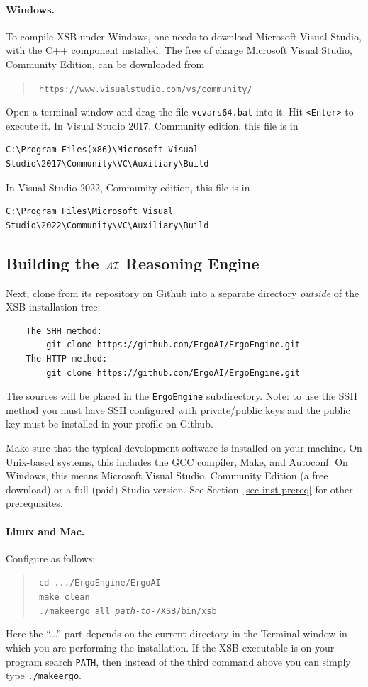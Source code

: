 \documentclass[11pt]{article}
\newcommand{\ERGO}{\mbox{\smaller{\ensuremath{\cal{E}}\smaller{{\sc{RGO}}}}}\xspace}
\newcommand{\ERGOAI}{\mbox{\smaller{\ensuremath{\cal{E}}\smaller{{\sc{RGO}}}}\ensuremath{\cal{AI}}}\xspace}
\newcommand{\FLSYSTEM}{\ERGO}
\begin{document}
\paragraph{Windows.}
To compile XSB under Windows, one needs to download Microsoft Visual Studio,
with the C++ component installed.
The free of charge Microsoft Visual Studio, Community Edition, can be
downloaded from
\begin{quote}
\tt
 https://www.visualstudio.com/vs/community/
\end{quote}

Open a terminal window and drag the file \texttt{vcvars64.bat} into it.
Hit \texttt{<Enter>} to execute it. 
In Visual Studio 2017, Community edition, this file is in
\begin{verbatim}
C:\Program Files(x86)\Microsoft Visual Studio\2017\Community\VC\Auxiliary\Build
\end{verbatim}
In Visual Studio 2022, Community edition, this file is in
\begin{verbatim}
C:\Program Files\Microsoft Visual Studio\2022\Community\VC\Auxiliary\Build
\end{verbatim}


\subsection{Building the \ERGOAI Reasoning Engine}

\sloppy
Next, clone \FLSYSTEM from its repository on Github
into a
separate directory \emph{outside} of the XSB installation tree:
\begin{verbatim}
    The SHH method:
        git clone https://github.com/ErgoAI/ErgoEngine.git
    The HTTP method:
        git clone https://github.com/ErgoAI/ErgoEngine.git
\end{verbatim}
The \FLSYSTEM
sources will be placed in the {\tt ErgoEngine} subdirectory.
Note: to use the SSH method you  must have SSH configured with
private/public keys and the public key must be installed in your profile on
Github.

Make sure that the typical development software is installed on your
machine. On Unix-based systems, this includes the GCC compiler, Make, and
Autoconf. On Windows, this means Microsoft Visual Studio, Community Edition
(a free download) or a full (paid) Studio version.
See Section~\ref{sec-inst-prereq} for other prerequisites.

\paragraph{Linux and Mac.}
Configure \FLSYSTEM as follows:
\begin{quote}
  \tt
   cd .../ErgoEngine/ErgoAI\\
   \tt
   make clean\\
   \tt
   ./makeergo all \textnormal{\emph{path-to-}}/XSB/bin/xsb
\end{quote}
Here the ``...'' part depends on the current directory in the Terminal window
in which you are performing the installation.
If the XSB executable is on your program search {\tt PATH}, then instead of the
third command above you can simply type
\texttt{./makeergo}. 
\end{document}
